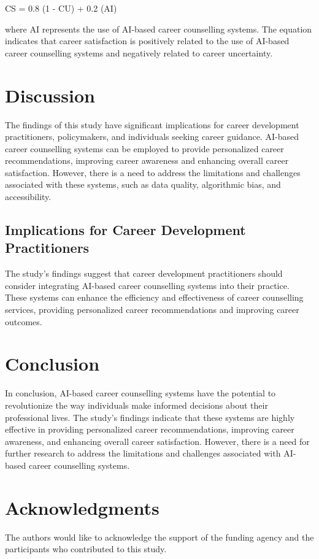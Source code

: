 \documentclass[12pt,a4paper]{article}
\begin{document}
CS = 0.8 \* (1 - CU) + 0.2 \* (AI)

where AI represents the use of AI-based career counselling systems. The equation indicates that career satisfaction is positively related to the use of AI-based career counselling systems and negatively related to career uncertainty.

\section{Discussion}
The findings of this study have significant implications for career development practitioners, policymakers, and individuals seeking career guidance. AI-based career counselling systems can be employed to provide personalized career recommendations, improving career awareness and enhancing overall career satisfaction. However, there is a need to address the limitations and challenges associated with these systems, such as data quality, algorithmic bias, and accessibility.

\subsection{Implications for Career Development Practitioners}
The study's findings suggest that career development practitioners should consider integrating AI-based career counselling systems into their practice. These systems can enhance the efficiency and effectiveness of career counselling services, providing personalized career recommendations and improving career outcomes.

\section{Conclusion}
In conclusion, AI-based career counselling systems have the potential to revolutionize the way individuals make informed decisions about their professional lives. The study's findings indicate that these systems are highly effective in providing personalized career recommendations, improving career awareness, and enhancing overall career satisfaction. However, there is a need for further research to address the limitations and challenges associated with AI-based career counselling systems.

\section*{Acknowledgments}
The authors would like to acknowledge the support of the funding agency and the participants who contributed to this study.
\end{document}
